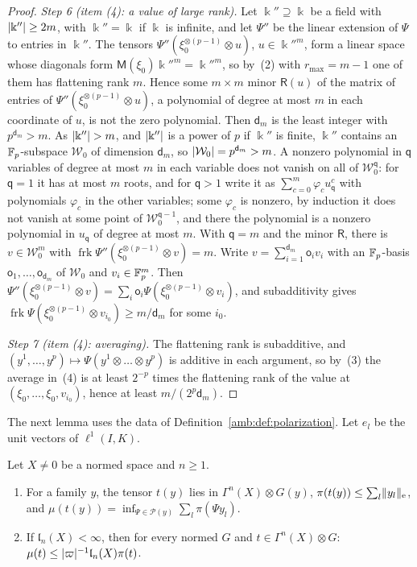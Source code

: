 \begin{proof}
\emph{Step 6 (item (4): a value of large rank).} Let $\Bbbk''\supseteq\Bbbk$ be a field with $\lvert \Bbbk''\rvert\ge2m$,
with $\Bbbk''=\Bbbk$ if $\Bbbk$ is infinite, and let $\Psi''$ be the linear extension of $\Psi$ to entries in $\Bbbk''$.
The tensors $\Psi''(\xi_0^{\otimes(p-1)}\otimes u)$, $u\in\Bbbk''^m$, form a linear space whose diagonals form
$\mathsf M(\xi_0)\Bbbk''^m=\Bbbk''^m$, so by~(2) with $r_{\max}=m-1$ one of them has flattening rank $m$. Hence some $m\times m$
minor $\mathsf R(u)$ of the matrix of entries of $\Psi''(\xi_0^{\otimes(p-1)}\otimes u)$, a polynomial of degree at most
$m$ in each coordinate of $u$, is not the zero polynomial. Then $\mathsf d_m$ is the least integer with
$p^{\mathsf d_m}>m$. As $\lvert \Bbbk''\rvert>m$, and $\lvert \Bbbk''\rvert$ is a power of $p$ if $\Bbbk''$ is finite, $\Bbbk''$ contains an
$\mathbb F_p$\nobreakdash-subspace $\mathcal W_0$ of dimension $\mathsf d_m$, so $\lvert \mathcal W_0\rvert=p^{\mathsf d_m}>m$. A nonzero polynomial in $\mathsf q$
variables of degree at most $m$ in each variable does not vanish on all of $\mathcal W_0^{\mathsf q}$: for $\mathsf q=1$ it has at most
$m$ roots, and for $\mathsf q>1$ write it as $\sum_{c=0}^m\varphi_cu_{\mathsf q}^c$ with polynomials $\varphi_c$ in the other variables;
some $\varphi_c$ is nonzero, by induction it does not vanish at some point of $\mathcal W_0^{\mathsf q-1}$, and there the
polynomial is a nonzero polynomial in $u_{\mathsf q}$ of degree at most $m$. With $\mathsf q=m$ and the minor $\mathsf R$, there is
$v\in\mathcal W_0^m$ with $\operatorname{frk}\Psi''(\xi_0^{\otimes(p-1)}\otimes v)=m$. Write
$v=\sum_{i=1}^{\mathsf d_m}\mathsf o_iv_i$ with an $\mathbb F_p$\nobreakdash-basis $\mathsf o_1,\dots,\mathsf o_{\mathsf d_m}$ of $\mathcal W_0$ and $v_i\in\mathbb F_p^m$.
Then $\Psi''(\xi_0^{\otimes(p-1)}\otimes v)=\sum_i\mathsf o_i\Psi(\xi_0^{\otimes(p-1)}\otimes v_i)$, and subadditivity gives
$\operatorname{frk}\Psi(\xi_0^{\otimes(p-1)}\otimes v_{i_0})\ge m/\mathsf d_m$ for some $i_0$.

\emph{Step 7 (item (4): averaging).} The flattening rank is subadditive, and
$(y^1,\dots,y^p)\mapsto\Psi(y^1\otimes\dots\otimes y^p)$ is additive in each argument, so by~(3) the average in~(4) is
at least $2^{-p}$ times the flattening rank of the value at $(\xi_0,\dots,\xi_0,v_{i_0})$, hence at least $m/(2^p\mathsf d_m)$.
\end{proof}

The next lemma uses the data of Definition~\ref{amb:def:polarization}. Let $e_l$ be the unit vectors of $\ell^1(I,K)$.

\begin{lemma}\label{amb:lem:family}
Let $X\ne0$ be a normed space and $n\ge1$.
\begin{enumerate}
\item For a family $y$, the tensor $t(y)$ lies in $\Gamma^n(X)\otimes G(y)$, $\pi(t(y))\le\sum_l\lVert y_l\rVert_{\rm e}$, and $\mu(t(y))=\inf_{\Psi\in\mathcal P(y)}\sum_l\pi(\Psi y_l)$.
\item If $\mathfrak l_n(X)<\infty$, then for every normed $G$ and $t\in\Gamma^n(X)\otimes G$: $\mu(t)\le\lvert \varpi\rvert^{-1}\mathfrak l_n(X)\pi(t)$.
\end{enumerate}
\end{lemma}

